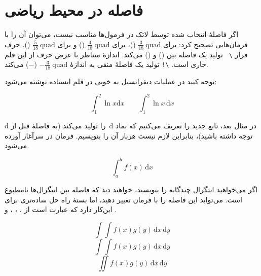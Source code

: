 \section{فاصله در محیط ریاضی}\label{sec:math-spacing}

اگر فاصلهٔ انتخاب شده توسط لاتک در فرمول‌ها مناسب نیست، می‌توان آن را با فرمان‌هایی تصحیح کرد: \ci{,} برای
$\frac{3}{18}\:\textrm{quad}$ (\demowidth{0.166em})، \ci{:} برای $\frac{4}{18}\:
\textrm{quad}$ (\demowidth{0.222em}) و  \ci{;} برای $\frac{5}{18}\:
\textrm{quad}$ (\demowidth{0.277em}).  حرف فرار \verb*|\ | تولید یک فاصله بین  
(\demowidth{1em}) و  (\demowidth{2em}) می‌کند. اندازهٔ 
 متناظر با عرض حرف  از این قلم جاری است.  \verb|\!|
تولید یک فاصلهٔ منفی به اندازهٔ  $-\frac{3}{18}\:\textrm{quad}$ ($-$\demowidth{0.166em}) می‌کند.

توجه کنید  در عملیات دیفرانسیل به خوبی در قلم ایستاده نوشته می‌شود:
\begin{example}
\begin{equation*}
 \int_1^2 \ln x \mathrm{d}x \qquad
 \int_1^2 \ln x \,\mathrm{d}x
\end{equation*}
\end{example}


در مثال بعد، تابع جدید  را تعریف می‌کنیم که نماد $\,\mathrm{d}$ را تولید می‌کند (به فاصلهٔ  
\demowidth{0.166em}
قبل از 
$\text{d}$ توجه داشته باشید)،
بنابراین لازم نیست هربار آن را بنویسیم. فرمان   در سرآغاز آورده می‌شود.
\begin{example}
\newcommand{\ud}{\,\mathrm{d}}

\begin{equation*}
 \int_a^b f(x)\ud x 
\end{equation*}
\end{example}

اگر می‌خواهید انتگرال چندگانه را بنویسید، خواهید دید که فاصله بین انتگرال‌ها نامطبوع است. می‌تواید این فاصله را با فرمان  \ci{!}
 تغییر دهید، اما بستۀ 
 راه حل ساده‌تری برای این‌کار دارد که عبارت است از  
، ، ،  و .

\begin{example}
\newcommand{\ud}{\,\mathrm{d}}

\[ \int\int f(x)g(y) 
                  \ud x \ud y \]
\[ \int\!\!\!\int 
         f(x)g(y) \ud x \ud y \]
\[ \iint f(x)g(y) \ud x \ud y \]
\end{example}

